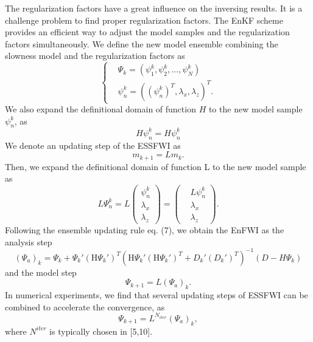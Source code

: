\documentclass[mreferee]{gji}
\begin{document}
The regularization factors have a great influence on the inversing results. It is a challenge problem to find proper regularization factors. The EnKF scheme provides an efficient way to adjust the model samples and the regularization factors simultaneously. We define the new model ensemble combining the slowness model and the regularization factors as
\begin{equation}
\left\{
\begin{aligned}
& \Psi_k=\left(\psi_1^k,\psi_2^k,...,\psi_N^k\right) \\
& \psi_n^k=\left((\psi_n^k)^T,\lambda_x,\lambda_z\right)^T.
\end{aligned}
\right.
\end{equation}
We also expand the definitional domain of function $H$ to the new model sample $\psi_n^k$, as
\begin{equation}
H\psi_n^{k}=H\psi_n^{k}
\end{equation}
We denote an updating step of the ESSFWI as
\begin{equation}
m_{k+1}=Lm_k.
\end{equation}
Then, we expand the definitional domain of function L to the new model sample as
\begin{equation}
L\Psi_n^k=L
\left(
\begin{aligned}
\psi_n^k \\
\lambda_x \\
\lambda_z
\end{aligned}
\right)
=
\left(
\begin{aligned}
& L\psi_n^k \\ 
& \lambda_x \\
& \lambda_z
\end{aligned}
\right).
\end{equation}
Following the ensemble updating rule eq. (7), we obtain the EnFWI as the analysis step
\begin{equation}
(\Psi_a)_k=\Psi_k+\Psi_k'(\mbox{H}\Psi_k')^T\left(\mbox{H}\Psi_k'(\mbox{H}\Psi_k')^T+D_k'(D_k')^T\right)^{-1}(D-H\Psi_k)
\end{equation}
and the model step 
\begin{equation}
\Psi_{k+1}=L(\Psi_a)_k.
\end{equation}
In numerical experiments, we find that several updating steps of ESSFWI can be combined to accelerate the convergence, as
\begin{equation}
\Psi_{k+1}=L^{N_{iter}}(\Psi_a)_k,
\end{equation}
where $N^{iter}$ is typically chosen in [5,10].
\end{document}
